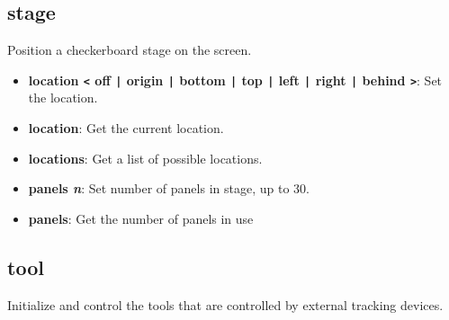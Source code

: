   \subsection{stage}
Position a checkerboard stage on the screen.  

  \begin{itemize}
    \item {\bf location {\tt <}  off {\tt |} origin {\tt |} bottom {\tt |} top 
{\tt |} left {\tt |} right {\tt |} behind {\tt >}}: Set the location.
    \item {\bf location}: Get the current location.
    \item {\bf locations}: Get a list of possible locations.
    \item {\bf panels {\it n}}: Set number of panels in stage, up to 30.
    \item {\bf panels}: Get the number of panels in use
  \end{itemize}



  \subsection{tool}
Initialize and control the tools that are controlled by external
tracking devices.

